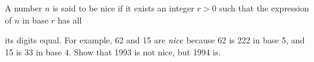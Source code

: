 A number $n$ is said to be nice if it exists an integer $r>0$ such that the expression of $n$ in base $r$ has all

its digits equal. For example, 62 and 15 are $\emph{nice}$ because 62 is 222 in base 5, and 15 is 33 in base 4. Show that 1993 is not nice, but 1994 is.